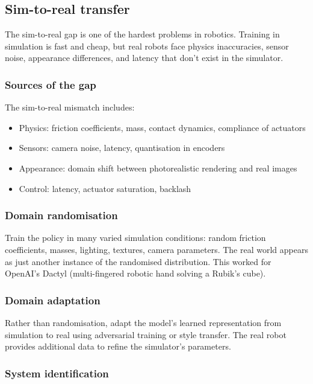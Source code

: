 \subsection{Sim-to-real transfer}

\begin{intuitionbox}
The sim-to-real gap is one of the hardest problems in robotics. Training in simulation is fast and cheap, but real robots face physics inaccuracies, sensor noise, appearance differences, and latency that don't exist in the simulator.
\end{intuitionbox}

\subsubsection{Sources of the gap}

The sim-to-real mismatch includes:
\begin{itemize}
\item Physics: friction coefficients, mass, contact dynamics, compliance of actuators
\item Sensors: camera noise, latency, quantisation in encoders
\item Appearance: domain shift between photorealistic rendering and real images
\item Control: latency, actuator saturation, backlash
\end{itemize}

\subsubsection{Domain randomisation}

Train the policy in many varied simulation conditions: random friction coefficients, masses, lighting, textures, camera parameters. The real world appears as just another instance of the randomised distribution. This worked for OpenAI's Dactyl (multi-fingered robotic hand solving a Rubik's cube).

\subsubsection{Domain adaptation}

Rather than randomisation, adapt the model's learned representation from simulation to real using adversarial training or style transfer. The real robot provides additional data to refine the simulator's parameters.

\subsubsection{System identification}

